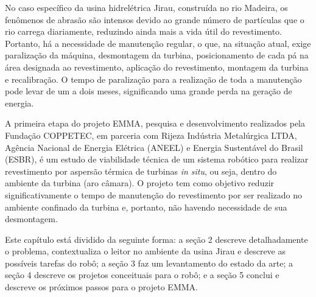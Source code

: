 No caso específico da usina hidrelétrica Jirau, construída no rio Madeira,
os fenômenos de abrasão são intensos devido ao grande número
de partículas que o rio carrega diariamente, reduzindo ainda mais a vida útil do
revestimento.
Portanto, há a necessidade de manutenção regular, o que, na situação atual,
exige paralização da máquina, desmontagem da turbina, posicionamento de cada pá
na área designada ao revestimento, aplicação do revestimento, montagem da
turbina e recalibração. O tempo de paralização para a realização de
toda a manutenção pode levar de um a dois meses, significando uma grande perda
na geração de energia. 

A primeira etapa do projeto EMMA, pesquisa e desenvolvimento
realizados pela Fundação COPPETEC, em parceria com Rijeza Indústria Metalúrgica LTDA, 
Agência Nacional de Energia Elétrica (ANEEL) e
Energia Sustentável do Brasil (ESBR), é um estudo de viabilidade técnica 
de um sistema robótico para realizar
revestimento por aspersão térmica de turbinas \textit{in situ}, ou seja, dentro
do ambiente da turbina (aro câmara). O projeto tem como objetivo reduzir
significativamente o tempo de manutenção do revestimento por ser realizado no
ambiente confinado da turbina e, portanto, não havendo necessidade de sua
desmontagem.

Este capítulo está dividido da seguinte forma: a seção 2 descreve
detalhadamente o problema, contextualiza o leitor no ambiente da usina Jirau e
descreve as possíveis tarefas do robô; a seção 3 faz um levantamento do estado da arte; a seção 4 descreve os projetos conceituais para o robô; e a
seção 5 conclui e descreve os próximos passos para o projeto EMMA. 



